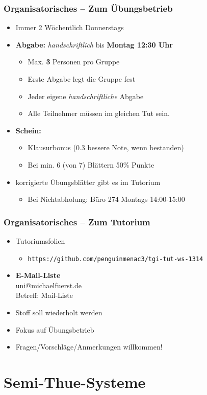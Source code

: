 \begin{frame}
	\frametitle{Organisatorisches -- Zum Übungsbetrieb}
	\begin{itemize}
		\item Immer 2 Wöchentlich Donnerstags
		\item \textbf{Abgabe:} \emph{handschriftlich} bis \textbf{Montag 12:30 Uhr}
		\begin{itemize}
			\item Max. \textbf{3} Personen pro Gruppe
			\item Erste Abgabe legt die Gruppe fest
			\item Jeder eigene \emph{handschriftliche} Abgabe
			\item Alle Teilnehmer müssen im gleichen Tut sein.
		\end{itemize}
		\item \textbf{Schein:} 
		\begin{itemize}
			\item Klausurbonus (0.3 bessere Note, wenn bestanden)
			\item Bei min. 6 (von 7) Blättern 50\% Punkte
		\end{itemize}
		\item korrigierte Übungsblätter gibt es im Tutorium
		\begin{itemize}
			\item Bei Nichtabholung: Büro 274 Montags 14:00-15:00
		\end{itemize}
	\end{itemize}
\end{frame}
\begin{frame}
	\frametitle{Organisatorisches -- Zum Tutorium}
	\begin{itemize}
	\item Tutoriumsfolien
		\begin{itemize}
			\item \texttt{https://github.com/penguinmenac3/tgi-tut-ws-1314}
		\end{itemize}
		\item \textbf{E-Mail-Liste} \\ uni@michaelfuerst.de \\ Betreff: Mail-Liste
		\item Stoff soll wiederholt werden
		\item Fokus auf Übungsbetrieb
		\item Fragen/Vorschläge/Anmerkungen willkommen!
	\end{itemize}
\end{frame}
\section{Semi-Thue-Systeme}
